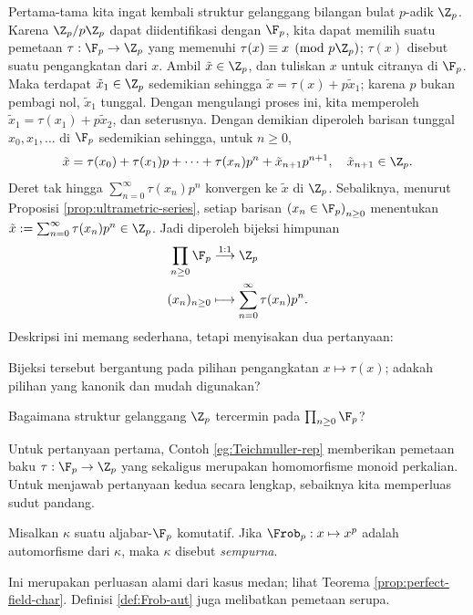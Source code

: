 Pertama-tama kita ingat kembali struktur gelanggang bilangan bulat $p$-adik $\Z_p$. Karena $\Z_p/p\Z_p$ dapat diidentifikasi dengan $\F_p$, kita dapat memilih suatu pemetaan $\tau: \F_p \to \Z_p$ yang memenuhi $\tau(x) \equiv x \pmod {p\Z_p}$; $\tau(x)$ disebut suatu pengangkatan dari $x$. Ambil $\tilde{x} \in \Z_p$, dan tuliskan $x$ untuk citranya di $\F_p$. Maka terdapat $\tilde{x}_1 \in \Z_p$ sedemikian sehingga $\tilde{x} = \tau(x) + p \tilde{x}_1$; karena $p$ bukan pembagi nol, $\tilde{x}_1$ tunggal. Dengan mengulangi proses ini, kita memperoleh $\tilde{x}_1 = \tau(x_1) + p\tilde{x}_2$, dan seterusnya. Dengan demikian diperoleh barisan tunggal $x_0, x_1, \ldots$ di $\F_p$ sedemikian sehingga, untuk $n \geq 0$,
\[ \tilde{x} = \tau(x_0) + \tau(x_1) p + \cdots + \tau(x_n) p^n + \tilde{x}_{n+1} p^{n+1}, \quad \tilde{x}_{n+1} \in \Z_p. \]
Deret tak hingga $\sum_{n=0}^\infty \tau(x_n) p^n$ konvergen ke $\tilde{x}$ di $\Z_p$. Sebaliknya, menurut Proposisi \ref{prop:ultrametric-series}, setiap barisan $\left( x_n \in \F_p \right)_{n \geq 0}$ menentukan $\tilde{x} := \sum_{n=0}^\infty \tau(x_n) p^n \in \Z_p$. Jadi diperoleh bijeksi himpunan
\begin{align*}
	\prod_{n \geq 0} \F_p & \stackrel{1:1}{\longrightarrow} \Z_p \\
	(x_n)_{n \geq 0} & \longmapsto \sum_{n=0}^\infty \tau(x_n) p^n.
\end{align*}
Deskripsi ini memang sederhana, tetapi menyisakan dua pertanyaan:
\begin{compactitem}
	\item Bijeksi tersebut bergantung pada pilihan pengangkatan $x \mapsto \tau(x)$; adakah pilihan yang kanonik dan mudah digunakan?
	\item Bagaimana struktur gelanggang $\Z_p$ tercermin pada $\prod_{n \geq 0} \F_p$?
\end{compactitem}
Untuk pertanyaan pertama, Contoh \ref{eg:Teichmuller-rep} memberikan pemetaan baku $\tau: \F_p \to \Z_p$ yang sekaligus merupakan homomorfisme monoid perkalian. Untuk menjawab pertanyaan kedua secara lengkap, sebaiknya kita memperluas sudut pandang.

\begin{definition}
	Misalkan $\kappa$ suatu aljabar-$\F_p$ komutatif. Jika $\Frob_p: x \mapsto x^p$ adalah automorfisme dari $\kappa$, maka $\kappa$ disebut \emph{sempurna}.
\end{definition}
Ini merupakan perluasan alami dari kasus medan; lihat Teorema \ref{prop:perfect-field-char}. Definisi \ref{def:Frob-aut} juga melibatkan pemetaan serupa.

